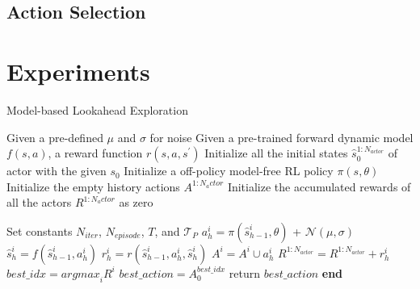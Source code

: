 \documentclass{article} %
\begin{document}
\subsection{Action Selection}

\section{Experiments}


\begin{algorithm}[h]
\scriptsize
\caption{Model-based Lookahead Exploration}\label{alg::adv_exp}
\begin{algorithmic}[1]
\State Given a pre-defined $\mu$ and $\sigma$ for noise
\State Given a pre-trained forward dynamic model $f(s, a)$, a reward function $r(s, a, s^\prime)$
\State Initialize all the initial states $\hat{s}^{1:N_{actor}}_0$ of actor with the given $s_0$
\State Initialize a off-policy model-free RL policy $\pi(s, \theta)$ %
\State Initialize the empty history actions $A^{1:N_actor}$
\State Initialize the accumulated rewards of all the actors
$R^{1:N_actor}$ as zero


\State Set constants $N_{iter}$, $N_{episode}$, $T$, and $\mathcal{T}_{P}$
        \State $a^i_h = \pi(\hat{s}^{i}_{h-1}, \theta)$ + $\mathcal{N}(\mu, \sigma)$
        \State $\hat{s}^{i}_{h} = f(\hat{s}^{i}_{h-1}, a^i_h)$ 
        \State $r^i_h = r(\hat{s}^{i}_{h-1}, a^i_h, \hat{s}^{i}_{h})$ 
        \State $A^{i} = A^{i} \cup a^i_h$
        \State $R^{1:N_{actor}} = R^{1:N_{actor}} + r^i_h$ 
    \EndFor
\EndFor
\State $best\_idx = {argmax}_{i} R^{i}$
\State $best\_action = A^{best\_idx}_{0}$
\State return $best\_action$
\State \textbf{end}
\end{algorithmic}
\end{algorithm}




\end{document}
